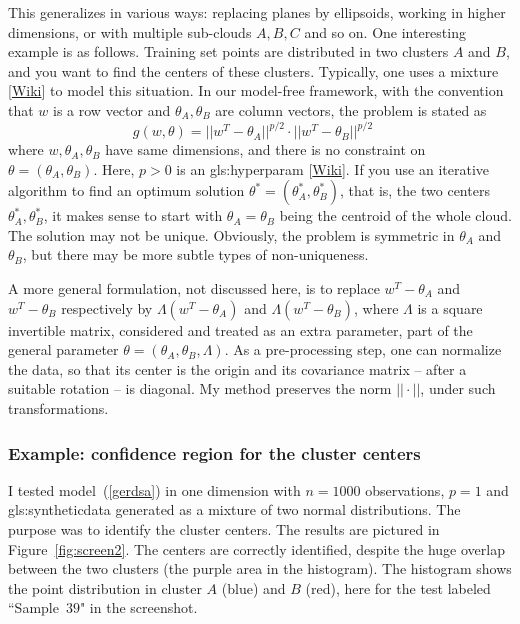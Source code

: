 \documentclass[oneside,10pt]{book}
\begin{document}
This generalizes in various ways: replacing planes by ellipsoids, working in higher dimensions, or with multiple sub-clouds
 $A, B, C$ and so on. One interesting example is as follows. Training set points are distributed in two clusters $A$ and $B$, and you want to find the centers of these clusters. Typically, one uses a \textcolor{index}{mixture} [\href{https://en.wikipedia.org/wiki/Mixture_model}{Wiki}] to model this situation.
 In our model-free framework, with the convention that $w$ is a row vector and $\theta_A,\theta_B$ are column vectors, the problem is stated as
\begin{equation}
g(w,\theta)=||w^T-\theta_A||^{p/2} \cdot ||w^T-\theta_B||^{p/2} \quad \label{gerdsa}
\end{equation}
where $w, \theta_A, \theta_B$ have same dimensions, and there is no constraint on $\theta=(\theta_A,\theta_B)$. Here, $p>0$ is an \gls{gls:hyperparam} [\href{https://en.wikipedia.org/wiki/Hyperparameter_(machine_learning)}{Wiki}].
If you use an iterative algorithm to find an optimum solution $\theta^*=(\theta_A^*,\theta_B^*)$, that is, the two centers $\theta_A^*,\theta_B^*$, it makes sense to start with
 $\theta_A=\theta_B$ being the centroid of the whole cloud. The solution may not be unique. Obviously, the problem is symmetric in $\theta_A$ and
$\theta_B$, but there may be more subtle types of non-uniqueness.

A more general formulation, not discussed here, is to replace $w^T-\theta_A$ and $w^T-\theta_B$ respectively by
$\Lambda(w^T-\theta_A)$ and $\Lambda(w^T-\theta_B)$, where $\Lambda$ is a square invertible matrix, considered and treated as an extra parameter,
 part of the general parameter $\theta=(\theta_A,\theta_B,\Lambda)$. As a pre-processing step, one can normalize the data, so that its center is the origin and its covariance matrix -- after a suitable rotation -- is diagonal. My method preserves the norm $||\cdot||$, under such transformations.

\subsubsection{Example: confidence region for the cluster centers}\label{reserse}

I tested model~(\ref{gerdsa}) in one dimension with $n=1000$ observations,
 $p=1$ and \gls{gls:syntheticdata} generated as a mixture of two normal distributions. The purpose was to identify the cluster centers. The results are pictured in Figure~\ref{fig:screen2}.  The centers are correctly identified, despite the huge overlap between the two clusters (the purple area in the histogram).
The histogram shows the point distribution in cluster $A$ (blue) and $B$ (red), here for the test labeled ``Sample~$39$" in the screenshot.
\end{document}
